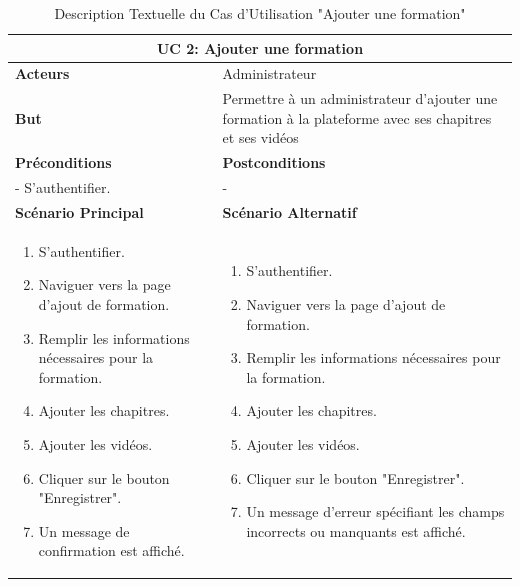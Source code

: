 \newpage

\begin{minipage}{\textwidth}
\begin{table}[H]
\centering
\begin{tabular}{| m{8cm} | m{8cm} |}
\hline
\multicolumn{2}{|c|}{\textbf{UC 2:} Ajouter une formation} \\ \hline
\textbf{Acteurs} & Administrateur \\ \hline
\textbf{But} & Permettre à un administrateur d'ajouter une formation à la plateforme avec ses chapitres et ses vidéos \\ \hline
\textbf{Préconditions} & \textbf{Postconditions} \\ \hline
- S'authentifier. & - \\ \hline
\textbf{Scénario Principal} & \textbf{Scénario Alternatif} \\ \hline
\begin{enumerate}
    \item S'authentifier.
    \item Naviguer vers la page d'ajout de formation.
    \item Remplir les informations nécessaires pour la formation.
    \item Ajouter les chapitres.
    \item Ajouter les vidéos.
    \item Cliquer sur le bouton "Enregistrer".
    \item Un message de confirmation est affiché.
\end{enumerate} & 
\begin{enumerate}
    \item S'authentifier.
    \item Naviguer vers la page d'ajout de formation.
    \item Remplir les informations nécessaires pour la formation.
    \item Ajouter les chapitres.
    \item Ajouter les vidéos.
    \item Cliquer sur le bouton "Enregistrer".
    \item Un message d'erreur spécifiant les champs incorrects ou manquants est affiché.
\end{enumerate} \\ \hline
\end{tabular}
\caption{Description Textuelle du Cas d'Utilisation "Ajouter une formation"}
\label{tab:use_case_description_2}
\end{table}
\end{minipage}

